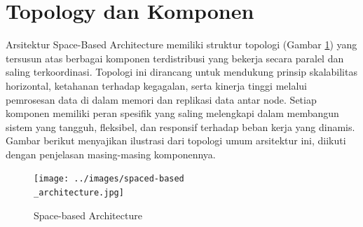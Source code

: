 \section{Topology dan Komponen}
Arsitektur Space-Based Architecture memiliki struktur topologi (Gambar \ref{fig:space-based_architecture}) yang tersusun atas berbagai komponen terdistribusi yang bekerja secara paralel dan saling terkoordinasi. Topologi ini dirancang untuk mendukung prinsip skalabilitas horizontal, ketahanan terhadap kegagalan, serta kinerja tinggi melalui pemrosesan data di dalam memori dan replikasi data antar node. Setiap komponen memiliki peran spesifik yang saling melengkapi dalam membangun sistem yang tangguh, fleksibel, dan responsif terhadap beban kerja yang dinamis. Gambar berikut menyajikan ilustrasi dari topologi umum arsitektur ini, diikuti dengan penjelasan masing-masing komponennya.


\begin{figure}[h]
	\centering
	\texttt{[image: ../images/spaced-based\\\_architecture.jpg]}
	\caption{Space-based Architecture}
	\label{fig:space-based_architecture}
\end{figure}

